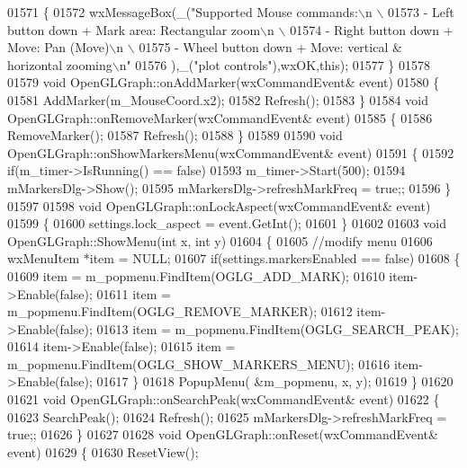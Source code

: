 \begin{DoxyCode}
{{{{{{{{{{{{{{{{01571 \{
01572     wxMessageBox(\_(\textcolor{stringliteral}{"Supported Mouse commands:\(\backslash\)n \(\backslash\)}
01573 \textcolor{stringliteral}{        - Left button down + Mark area: Rectangular zoom\(\backslash\)n \(\backslash\)}
01574 \textcolor{stringliteral}{        - Right button down + Move: Pan (Move)\(\backslash\)n \(\backslash\)}
01575 \textcolor{stringliteral}{        - Wheel button down + Move: vertical & horizontal zooming\(\backslash\)n"}
01576         ),\_(\textcolor{stringliteral}{"plot controls"}),wxOK,\textcolor{keyword}{this});
01577 \}
01578 
01579 \textcolor{keywordtype}{void} OpenGLGraph::onAddMarker(wxCommandEvent& event)
01580 \{
01581     AddMarker(m_MouseCoord.x2);
01582     Refresh();
01583 \}
01584 \textcolor{keywordtype}{void} OpenGLGraph::onRemoveMarker(wxCommandEvent& event)
01585 \{
01586     RemoveMarker();
01587     Refresh();
01588 \}
01589 
01590 \textcolor{keywordtype}{void} OpenGLGraph::onShowMarkersMenu(wxCommandEvent& event)
01591 \{
01592     \textcolor{keywordflow}{if}(m_timer->IsRunning() == \textcolor{keyword}{false})
01593         m_timer->Start(500);
01594     mMarkersDlg->Show();
01595     mMarkersDlg->refreshMarkFreq = \textcolor{keyword}{true};;
01596 \}
01597 
01598 \textcolor{keywordtype}{void} OpenGLGraph::onLockAspect(wxCommandEvent& event)
01599 \{
01600     settings.lock_aspect = \textcolor{keyword}{event}.GetInt();
01601 \}
01602 
01603 \textcolor{keywordtype}{void} OpenGLGraph::ShowMenu(\textcolor{keywordtype}{int} x, \textcolor{keywordtype}{int} y)
01604 \{
01605     \textcolor{comment}{//modify menu}
01606     wxMenuItem *item = NULL;
01607     \textcolor{keywordflow}{if}(settings.markersEnabled == \textcolor{keyword}{false})
01608     \{
01609         item = m_popmenu.FindItem(OGLG_ADD_MARK);
01610         item->Enable(\textcolor{keyword}{false});
01611         item = m_popmenu.FindItem(OGLG_REMOVE_MARKER);
01612         item->Enable(\textcolor{keyword}{false});
01613         item = m_popmenu.FindItem(OGLG_SEARCH_PEAK);
01614         item->Enable(\textcolor{keyword}{false});
01615         item = m_popmenu.FindItem(OGLG_SHOW_MARKERS_MENU);
01616         item->Enable(\textcolor{keyword}{false});
01617     \}
01618     PopupMenu( &m_popmenu, x, y);
01619 \}
01620 
01621 \textcolor{keywordtype}{void} OpenGLGraph::onSearchPeak(wxCommandEvent& event)
01622 \{
01623     SearchPeak();
01624     Refresh();
01625     mMarkersDlg->refreshMarkFreq = \textcolor{keyword}{true};;
01626 \}
01627 
01628 \textcolor{keywordtype}{void} OpenGLGraph::onReset(wxCommandEvent& event)
01629 \{
01630     ResetView();
}}}}}}}}}}}}}}}}
\end{DoxyCode}
